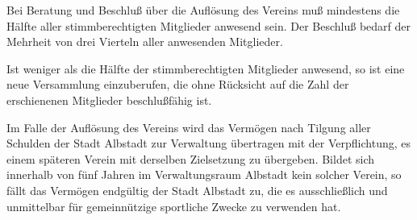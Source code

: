 \documentclass[10pt,a4paper,parskip=half]{scrartcl}
\begin{document}
\begin{contract}
    Bei Beratung und Beschluß über die Auflösung des Vereins muß mindestens die Hälfte aller stimmberechtigten Mitglieder anwesend sein.
    Der Beschluß bedarf der Mehrheit von drei Vierteln aller anwesenden Mitglieder.
    
    Ist weniger als die Hälfte der stimmberechtigten Mitglieder anwesend,
    so ist eine neue Versammlung einzuberufen,
    die ohne Rücksicht auf die Zahl der erschienenen Mitglieder beschlußfähig ist.
    
    Im Falle der Auflösung des Vereins wird das Vermögen nach Tilgung aller Schulden der Stadt Albstadt zur Verwaltung übertragen mit der Verpflichtung,
    es einem späteren Verein mit derselben Zielsetzung zu übergeben.
    Bildet sich innerhalb von fünf Jahren im Verwaltungsraum Albstadt kein solcher Verein,
    so fällt das Vermögen endgültig der Stadt Albstadt zu,
    die es ausschließlich und unmittelbar für gemeinnützige sportliche Zwecke zu verwenden hat.
\end{contract}
\end{document}
